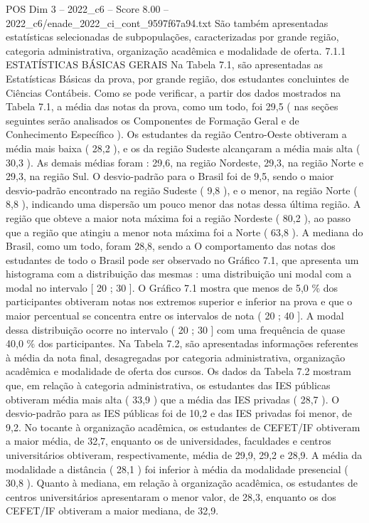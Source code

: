 \begin{textsample}{POS Dim 3 – 2022\_c6 – Score 8.00 – 2022\_c6/enade\_2022\_ci\_cont\_9597f67a94.txt}
São também apresentadas estatísticas selecionadas de subpopulações, caracterizadas por grande região, categoria administrativa, organização acadêmica e modalidade de oferta. 7.1.1 ESTATÍSTICAS BÁSICAS GERAIS Na Tabela 7.1, são apresentadas as Estatísticas Básicas da prova, por grande região, dos estudantes concluintes de Ciências Contábeis.
Como se pode verificar, a partir dos dados mostrados na Tabela 7.1, a média das notas da prova, como um todo, foi 29,5 ( nas seções seguintes serão analisados os Componentes de Formação Geral e de Conhecimento Específico ).
Os estudantes da região Centro-Oeste obtiveram a média mais baixa ( 28,2 ), e os da região Sudeste alcançaram a média mais alta ( 30,3 ).
As demais médias foram : 29,6, na região Nordeste, 29,3, na região Norte e 29,3, na região Sul.
O desvio-padrão para o Brasil foi de 9,5, sendo o maior desvio-padrão encontrado na região Sudeste ( 9,8 ), e o menor, na região Norte ( 8,8 ), indicando uma dispersão um pouco menor das notas dessa última região.
A região que obteve a maior nota máxima foi a região Nordeste ( 80,2 ), ao passo que a região que atingiu a menor nota máxima foi a Norte ( 63,8 ).
A mediana do Brasil, como um todo, foram 28,8, sendo a O comportamento das notas dos estudantes de todo o Brasil pode ser observado no Gráfico 7.1, que apresenta um histograma com a distribuição das mesmas : uma distribuição uni modal com a modal no intervalo [ 20 ; 30 ].
O Gráfico 7.1 mostra que menos de 5,0 \% dos participantes obtiveram notas nos extremos superior e inferior na prova e que o maior percentual se concentra entre os intervalos de nota ( 20 ; 40 ].
A modal dessa distribuição ocorre no intervalo ( 20 ; 30 ] com uma frequência de quase 40,0 \% dos participantes.
Na Tabela 7.2, são apresentadas informações referentes à média da nota final, desagregadas por categoria administrativa, organização acadêmica e modalidade de oferta dos cursos.
Os dados da Tabela 7.2 mostram que, em relação à categoria administrativa, os estudantes das IES públicas obtiveram média mais alta ( 33,9 ) que a média das IES privadas ( 28,7 ).
O desvio-padrão para as IES públicas foi de 10,2 e das IES privadas foi menor, de 9,2.
No tocante à organização acadêmica, os estudantes de CEFET/IF obtiveram a maior média, de 32,7, enquanto os de universidades, faculdades e centros universitários obtiveram, respectivamente, média de 29,9, 29,2 e 28,9.
A média da modalidade a distância ( 28,1 ) foi inferior à média da modalidade presencial ( 30,8 ).
Quanto à mediana, em relação à organização acadêmica, os estudantes de centros universitários apresentaram o menor valor, de 28,3, enquanto os dos CEFET/IF obtiveram a maior mediana, de 32,9.

\end{textsample}
